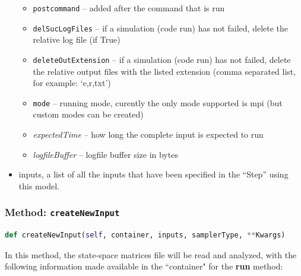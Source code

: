 \begin{itemize}
\begin{itemize}
    \item \texttt{postcommand} -- added after the command that is run
    \item \texttt{delSucLogFiles} -- if a simulation (code run) has not failed,
    delete the relative log file (if True)
    \item \texttt{deleteOutExtension} -- if a simulation (code run) has not
    failed, delete the relative output files with the listed extension (comma
    separated list, for example: `e,r,txt')
    \item \texttt{mode} -- running mode, curently the only mode supported is
      mpi (but custom modes can be created)
    \item \textit{expectedTime} -- how long the complete input is expected to
    run
    \item \textit{logfileBuffer} -- logfile buffer size in bytes
  \end{itemize}
  \item inputs, a list of all the inputs that have been specified in the
  ``Step'' using this model.
\end{itemize}

\subsubsection{Method: \texttt{createNewInput}}
\label{subsubsec:externalcreateNewInputExternalModelPlugin}
\begin{lstlisting}[language=python]
  def createNewInput(self, container, inputs, samplerType, **Kwargs)
\end{lstlisting}
In this method, the state-space matrices file will be read and analyzed, with the 
following information made available in the ``container" for the \textbf{run} method:

